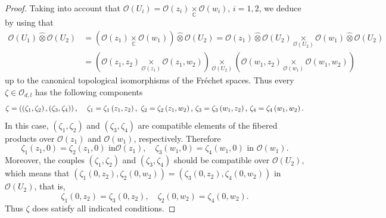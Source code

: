\documentclass[12pt,reqno]{amsart}%
\theoremstyle{plain}
\numberwithin{theorem}{section} \numberwithin{equation}{section}
\numberwithin{lemma}{section}
\numberwithin{remark}{section}
\numberwithin{example}{section}
\numberwithin{proposition}{section}
\numberwithin{definition}{section}
\numberwithin{corollary}{section}
\begin{document}
\begin{proof}
Taking into account that $\mathcal{O}\left(  U_{i}\right)  =\mathcal{O}\left(
z_{i}\right)  \underset{\mathbb{C}}{\times}\mathcal{O}\left(  w_{i}\right)  $,
$i=1,2$, we deduce by using \cite[Proposition 3.2]{Dosi25} that
\begin{align*}
\mathcal{O}\left(  U_{1}\right)  \widehat{\otimes}\mathcal{O}\left(
U_{2}\right)   &  =\left(  \mathcal{O}\left(  z_{1}\right)
\underset{\mathbb{C}}{\times}\mathcal{O}\left(  w_{1}\right)  \right)
\widehat{\otimes}\mathcal{O}\left(  U_{2}\right)  =\mathcal{O}\left(
z_{1}\right)  \widehat{\otimes}\mathcal{O}\left(  U_{2}\right)
\underset{\mathcal{O}\left(  U_{2}\right)  }{\times}\mathcal{O}\left(
w_{1}\right)  \widehat{\otimes}\mathcal{O}\left(  U_{2}\right) \\
&  =\left(  \mathcal{O}\left(  z_{1},z_{2}\right)  \underset{\mathcal{O}%
\left(  z_{1}\right)  }{\times}\mathcal{O}\left(  z_{1},w_{2}\right)  \right)
\underset{\mathcal{O}\left(  U_{2}\right)  }{\times}\left(  \mathcal{O}\left(
w_{1},z_{2}\right)  \underset{\mathcal{O}\left(  w_{1}\right)  }{\times
}\mathcal{O}\left(  w_{1},w_{2}\right)  \right)
\end{align*}
up to the canonical topological isomorphisms of the Fr\'{e}chet spaces. Thus
every $\zeta\in\mathcal{O}_{d,l}$ has the following components
\[
\zeta=\left(  \left(  \zeta_{1},\zeta_{2}\right)  ,\left(  \zeta_{3},\zeta
_{4}\right)  \right)  \text{, \quad}\zeta_{1}=\zeta_{1}\left(  z_{1}%
,z_{2}\right)  ,\text{ }\zeta_{2}=\zeta_{2}\left(  z_{1},w_{2}\right)  \text{,
}\zeta_{3}=\zeta_{3}\left(  w_{1},z_{2}\right)  \text{, }\zeta_{4}=\zeta
_{4}\left(  w_{1},w_{2}\right)  .
\]
In this case, $\left(  \zeta_{1},\zeta_{2}\right)  $ and $\left(  \zeta
_{3},\zeta_{4}\right)  $ are compatible elements of the fibered products over
$\mathcal{O}\left(  z_{1}\right)  $ and $\mathcal{O}\left(  w_{1}\right)  $,
respectively. Therefore
\[
\zeta_{1}\left(  z_{1},0\right)  =\zeta_{2}\left(  z_{1},0\right)  \text{ in
}\mathcal{O}\left(  z_{1}\right)  ,\quad\zeta_{3}\left(  w_{1},0\right)
=\zeta_{4}\left(  w_{1},0\right)  \text{ in }\mathcal{O}\left(  w_{1}\right)
.
\]
Moreover, the couples $\left(  \zeta_{1},\zeta_{2}\right)  $ and $\left(
\zeta_{3},\zeta_{4}\right)  $ should be compatible over $\mathcal{O}\left(
U_{2}\right)  $, which means that $\left(  \zeta_{1}\left(  0,z_{2}\right)
,\zeta_{2}\left(  0,w_{2}\right)  \right)  =\left(  \zeta_{3}\left(
0,z_{2}\right)  ,\zeta_{4}\left(  0,w_{2}\right)  \right)  $ in $\mathcal{O}%
\left(  U_{2}\right)  $, that is,
\[
\zeta_{1}\left(  0,z_{2}\right)  =\zeta_{3}\left(  0,z_{2}\right)  ,\quad
\zeta_{2}\left(  0,w_{2}\right)  =\zeta_{4}\left(  0,w_{2}\right)  .
\]
Thus $\zeta$ does satisfy all indicated conditions.
\end{proof}
\end{document}
